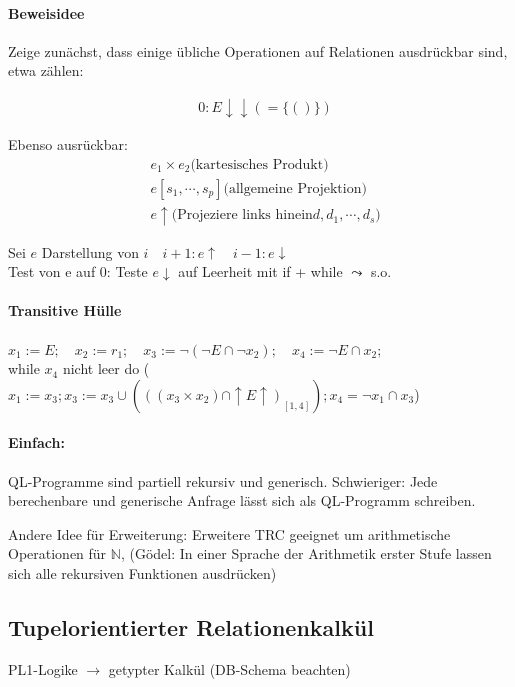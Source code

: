 \documentclass[12pt, a4paper]{article}
\begin{document}
\paragraph*{Beweisidee}

Zeige zunächst, dass einige übliche Operationen auf Relationen ausdrückbar sind, etwa zählen:

\begin{align*}
& 0: E \downarrow\downarrow (= \{()\})
\end{align*}

Ebenso ausrückbar:
\begin{align*}
&e_1 \times e_2 \text{(kartesisches Produkt)} \\
&e[s_1, \cdots, s_p] \text{(allgemeine Projektion)} \\
&e\uparrow \text{(Projeziere links hinein} d,d_1,\cdots,d_s)
\end{align*}

Sei $e$ Darstellung von $i \quad i+1 : e\uparrow \quad i-1: e\downarrow$ \\ Test von e auf 0: Teste $e\downarrow$ auf Leerheit mit if + while $\leadsto$ s.o.

\paragraph{Transitive Hülle} 
$x_1 := E; \quad x_2 := r_1; \quad x_3 := \lnot (\lnot E \cap \lnot x_2); \quad x_4 := \lnot E \cap x_2;$ \\
while $x_4$ nicht leer do ($x_1 := x_3; x_3 := x_3 \cup (((x_3 \times x_2) \cap \uparrow E \uparrow)_{[1,4]}); x_4 = \lnot x_1 \cap x_3$)

\paragraph{Einfach:} QL-Programme sind partiell rekursiv und generisch. Schwieriger: Jede berechenbare und generische Anfrage lässt sich als QL-Programm schreiben.

Andere Idee für Erweiterung: Erweitere TRC geeignet um arithmetische Operationen für $\mathbb{N}$, (Gödel: In einer Sprache der Arithmetik erster Stufe lassen sich alle rekursiven Funktionen ausdrücken)

\subsection*{Tupelorientierter Relationenkalkül}
PL1-Logike $\rightarrow$ getypter Kalkül (DB-Schema beachten)
\end{document}
